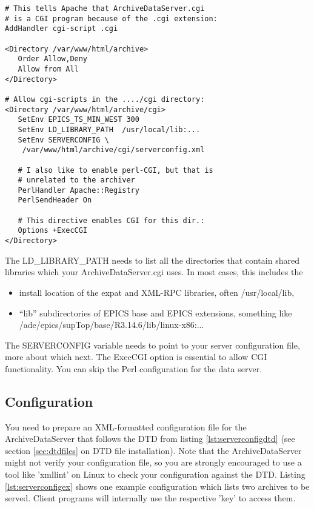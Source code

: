 \begin{enumerate}
\begin{lstlisting}[keywordstyle=\sffamily]
# This tells Apache that ArchiveDataServer.cgi
# is a CGI program because of the .cgi extension:
AddHandler cgi-script .cgi

<Directory /var/www/html/archive>
   Order Allow,Deny
   Allow from All
</Directory>

# Allow cgi-scripts in the ..../cgi directory:
<Directory /var/www/html/archive/cgi>
   SetEnv EPICS_TS_MIN_WEST 300
   SetEnv LD_LIBRARY_PATH  /usr/local/lib:...
   SetEnv SERVERCONFIG \
    /var/www/html/archive/cgi/serverconfig.xml

   # I also like to enable perl-CGI, but that is
   # unrelated to the archiver
   PerlHandler Apache::Registry
   PerlSendHeader On

   # This directive enables CGI for this dir.:
   Options +ExecCGI
</Directory>
\end{lstlisting}
  The LD\_LIBRARY\_PATH needs to list all the directories that
  contain shared libraries which your ArchiveDataServer.cgi uses.
  In most cases, this includes the
  \begin{itemize}
  \item install location of the expat and XML-RPC
        libraries, often /usr/local/lib,
  \item ``lib'' subdirectories of EPICS base and EPICS extensions,
        something like /ade/epics/supTop/base/R3.14.6/lib/linux-x86:...
  \end{itemize}
  The SERVERCONFIG variable needs to point to your server configuration
  file, more about which next. The ExecCGI option is essential to
  allow CGI functionality. You can skip the Perl configuration for the
  data server.
\end{enumerate}

\subsection{Configuration}  %
You need to prepare an XML-formatted configuration file for the
ArchiveDataServer that follows the DTD from listing
\ref{lst:serverconfigdtd} (see section \ref{sec:dtdfiles} on DTD file
installation). Note that the ArchiveDataServer might not verify your
configuration file, so you are strongly encouraged to use a tool like
'xmllint' on Linux to check your configuration against the
DTD. Listing \ref{lst:serverconfigex} shows one example configuration
which lists two archives to be served. Client programs will internally
use the respective 'key' to access them.


